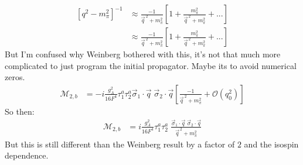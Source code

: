 \documentclass[11pt]{article}
\newcommand\mm{\mathcal{M}}
\newcommand{\sq}{^{\,2}}
\begin{document}
\begin{align}
    \left[ q^2-m_\pi^2 \right]^{-1}&\approx \frac{-1}{\vec{q}\sq + m_\pi^2} \left[ 1+ \frac{m^2_\pi}{\vec{q}\sq +m_\pi^2} +... \right]\\
                 &\approx \frac{-1}{\vec{q}\sq + m_\pi^2} \left[ 1+ \frac{m^2_\pi}{\vec{q}\sq +m_\pi^2} +... \right]
\end{align}
But I'm confused why Weinberg bothered with this, it's not that much more complicated to just program the initial propagator. Maybe its to avoid numerical zeros.
\begin{align}
    \mm_{2,b} &=-i\frac{g_A^2}{16F^4}\tau_1^a\tau_2^a\vec \sigma_1 \cdot \vec{q}\;\vec\sigma_2 \cdot \vec{q} 
    \left[\frac{-1}{\vec{q}\sq +m_\pi^2} + \mathcal{O}(q_0^2) \right]
\end{align}
So then:
\begin{align}
    \mm_{2,b} &=i\frac{g_A^2}{16F^4}\tau_1^a\tau_2^a \;\frac{\vec{\sigma}_1 \cdot \vec{q}\;\vec\sigma_2 \cdot \vec{q} }{\vec{q}\sq +m_\pi^2}
\end{align}
But this is still different than the Weinberg result by a factor of $2$ and the isospin dependence.
\end{document}
